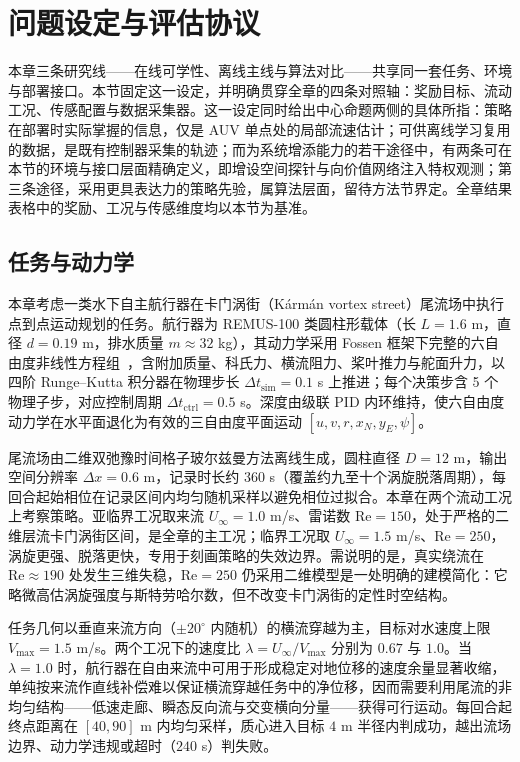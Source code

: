 \section{问题设定与评估协议}\label{sec:ch5_setup}

本章三条研究线——在线可学性、离线主线与算法对比——共享同一套任务、环境与部署接口。本节固定这一设定，并明确贯穿全章的四条对照轴：奖励目标、流动工况、传感配置与数据采集器。这一设定同时给出中心命题两侧的具体所指：策略在部署时实际掌握的信息，仅是 AUV 单点处的局部流速估计；可供离线学习复用的数据，是既有控制器采集的轨迹；而为系统增添能力的若干途径中，有两条可在本节的环境与接口层面精确定义，即增设空间探针与向价值网络注入特权观测；第三条途径，采用更具表达力的策略先验，属算法层面，留待方法节界定。全章结果表格中的奖励、工况与传感维度均以本节为基准。

\subsection{任务与动力学}\label{subsec:ch5_task}

本章考虑一类水下自主航行器在卡门涡街（Kármán vortex street）尾流场中执行点到点运动规划的任务。航行器为 REMUS-100 类圆柱形载体（长 $L=1.6$ m，直径 $d=0.19$ m，排水质量 $m\approx 32$ kg），其动力学采用 Fossen 框架下完整的六自由度非线性方程组~\citep{fossen2011handbook}，含附加质量、科氏力、横流阻力、桨叶推力与舵面升力，以四阶 Runge--Kutta 积分器在物理步长 $\Delta t_{\mathrm{sim}}=0.1$ s 上推进；每个决策步含 5 个物理子步，对应控制周期 $\Delta t_{\mathrm{ctrl}}=0.5$ s。深度由级联 PID 内环维持，使六自由度动力学在水平面退化为有效的三自由度平面运动 $[u,v,r,x_N,y_E,\psi]$。

尾流场由二维双弛豫时间格子玻尔兹曼方法离线生成，圆柱直径 $D=12$ m，输出空间分辨率 $\Delta x=0.6$ m，记录时长约 $360$ s（覆盖约九至十个涡旋脱落周期），每回合起始相位在记录区间内均匀随机采样以避免相位过拟合。本章在两个流动工况上考察策略。亚临界工况取来流 $U_\infty=1.0$ m/s、雷诺数 $\mathrm{Re}=150$，处于严格的二维层流卡门涡街区间，是全章的主工况；临界工况取 $U_\infty=1.5$ m/s、$\mathrm{Re}=250$，涡旋更强、脱落更快，专用于刻画策略的失效边界。需说明的是，真实绕流在 $\mathrm{Re}\approx 190$ 处发生三维失稳，$\mathrm{Re}=250$ 仍采用二维模型是一处明确的建模简化：它略微高估涡旋强度与斯特劳哈尔数，但不改变卡门涡街的定性时空结构。

任务几何以垂直来流方向（$\pm 20^\circ$ 内随机）的横流穿越为主，目标对水速度上限 $V_{\max}=1.5$ m/s。两个工况下的速度比 $\lambda=U_\infty/V_{\max}$ 分别为 $0.67$ 与 $1.0$。当 $\lambda=1.0$ 时，航行器在自由来流中可用于形成稳定对地位移的速度余量显著收缩，单纯按来流作直线补偿难以保证横流穿越任务中的净位移，因而需要利用尾流的非均匀结构——低速走廊、瞬态反向流与交变横向分量——获得可行运动。每回合起终点距离在 $[40,90]$ m 内均匀采样，质心进入目标 $4$ m 半径内判成功，越出流场边界、动力学违规或超时（$240$ s）判失败。

